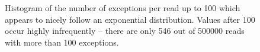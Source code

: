 \begin{figure}
	\centering

	\caption{\label{fig:nex-hist}Histogram of the number of exceptions per read up to 100 which appears to nicely follow an exponential distribution. Values after 100 occur highly infrequently -- there are only 546 out of \num{500000} reads with more than 100 exceptions.}
\end{figure}
